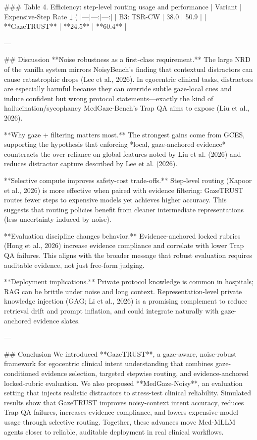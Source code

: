 ### Table 4. Efficiency: step-level routing usage and performance  
| Variant | Expensive-Step Rate ↓ (%
|---|---:|---:|
| B3: TSR-CW | 38.0 | 50.9 |
| **GazeTRUST** | **24.5** | **60.4** |

---

## Discussion  
**Noise robustness as a first-class requirement.** The large NRD of the vanilla system mirrors NoisyBench’s finding that contextual distractors can cause catastrophic drops (Lee et al., 2026). In egocentric clinical tasks, distractors are especially harmful because they can override subtle gaze-local cues and induce confident but wrong protocol statements—exactly the kind of hallucination/sycophancy MedGaze-Bench’s Trap QA aims to expose (Liu et al., 2026).

**Why gaze + filtering matters most.** The strongest gains come from GCES, supporting the hypothesis that enforcing *local, gaze-anchored evidence* counteracts the over-reliance on global features noted by Liu et al. (2026) and reduces distractor capture described by Lee et al. (2026).

**Selective compute improves safety-cost trade-offs.** Step-level routing (Kapoor et al., 2026) is more effective when paired with evidence filtering: GazeTRUST routes fewer steps to expensive models yet achieves higher accuracy. This suggests that routing policies benefit from cleaner intermediate representations (less uncertainty induced by noise).

**Evaluation discipline changes behavior.** Evidence-anchored locked rubrics (Hong et al., 2026) increase evidence compliance and correlate with lower Trap QA failures. This aligns with the broader message that robust evaluation requires auditable evidence, not just free-form judging.

**Deployment implications.** Private protocol knowledge is common in hospitals; RAG can be brittle under noise and long context. Representation-level private knowledge injection (GAG; Li et al., 2026) is a promising complement to reduce retrieval drift and prompt inflation, and could integrate naturally with gaze-anchored evidence slates.

---

## Conclusion  
We introduced **GazeTRUST**, a gaze-aware, noise-robust framework for egocentric clinical intent understanding that combines gaze-conditioned evidence selection, targeted stepwise routing, and evidence-anchored locked-rubric evaluation. We also proposed **MedGaze-Noisy**, an evaluation setting that injects realistic distractors to stress-test clinical reliability. Simulated results show that GazeTRUST improves noisy-context intent accuracy, reduces Trap QA failures, increases evidence compliance, and lowers expensive-model usage through selective routing. Together, these advances move Med-MLLM agents closer to reliable, auditable deployment in real clinical workflows.


